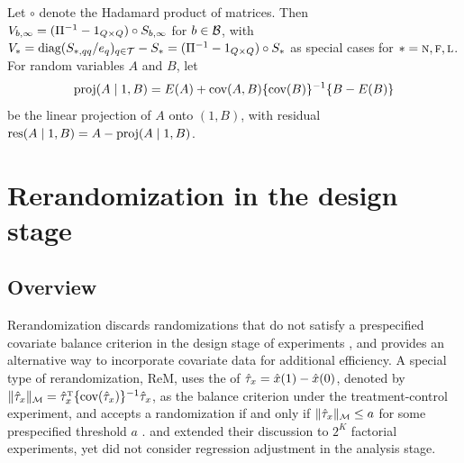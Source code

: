 \documentclass[11pt]{article}
\theoremstyle{definition}
\begin{document}
Let $\circ$ denote the Hadamard product of matrices. 
Then $
V_{b,\infty} =  (\Pi^{-1}-1_{Q\times Q}) \circ S_{b,\infty}$ for $b\in\mathcal{B}$, with $V_* =  \text{diag}( S _{*,qq} /e_q )_{q\in\mathcal{T}} -  S_* = (\Pi^{-1}-1_{Q\times Q}) \circ S_*$ as special cases for $* =\textsc{n}, \textsc{f}, \textsc{l}$.
For random variables $A$ and $B$, let $$\textrm{proj}(A \mid  1, B) = E(A) + \text{cov}(A, B)\{\text{cov}(B)\}^{-1}\{B-E(B)\}$$  be the linear projection of $A$ onto $(1, B)$, %
with residual  $\textrm{res}(A \mid  1,B) = A - \textrm{proj}(A \mid  1,B)$.

\section{Rerandomization in the design stage}\label{sec:rem}
\subsection{Overview}

Rerandomization discards randomizations that do not satisfy a prespecified covariate balance criterion in the design stage of experiments \citep{cox:1982, morgan2012rerandomization}, and provides an alternative way to incorporate covariate data for additional efficiency.
A special type of rerandomization, ReM, uses the \mhld of $\hat\tau_x = \hat x(1) - \hat x(0)$, denoted by $\|\htx\|_\mm = \htx^\T \{\cov(\htx)\}^{-1} \htx$, as the balance criterion under the treatment-control experiment, and accepts a randomization if and only if $\|\htx\|_\mm \leq a$ for some prespecified threshold $a$  \citep{morgan2012rerandomization, LD2018, LD20, ZDfrt}. 
\citet{branson} and \citet{AOS} extended their discussion to $2^K$ factorial experiments, yet did not consider regression adjustment in the analysis stage. 
\end{document}
